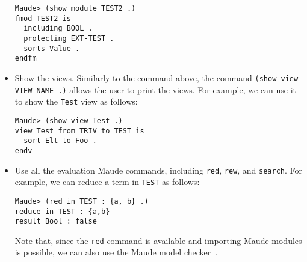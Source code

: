 \begin{itemize}
{\codesize
\begin{verbatim}
Maude> (show module TEST2 .)
fmod TEST2 is
  including BOOL .
  protecting EXT-TEST .
  sorts Value .
endfm
\end{verbatim}
}

\item
Show the views. Similarly to the command above, the command \verb"(show view VIEW-NAME .)"
allows the user to print the views. For example, we can use it to show the \verb"Test"
view as follows:

{\codesize
\begin{verbatim}
Maude> (show view Test .)
view Test from TRIV to TEST is
  sort Elt to Foo . 
endv
\end{verbatim}
}

\item
Use all the evaluation Maude commands, including \verb"red", \verb"rew", and \verb"search".
For example, we can reduce a term in \verb"TEST" as follows:

{\codesize
\begin{verbatim}
Maude> (red in TEST : {a, b} .)
reduce in TEST : {a,b}
result Bool : false
\end{verbatim}
}

Note that, since the \verb"red" command is available and importing Maude modules is possible,
we can also use the Maude model checker~\cite[Chapter 13]{maude-book}. 

\end{itemize}






